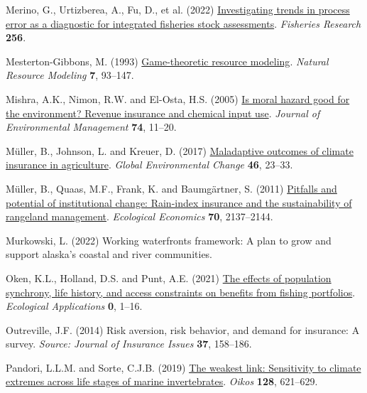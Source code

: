 \documentclass[
  letterpaper,
  DIV=11,
  numbers=noendperiod]{scrartcl}
\newlength{\cslhangindent}
\newlength{\cslentryspacingunit} %
\newenvironment{CSLReferences}[2] %
 {%
  \setlength{\parindent}{0pt}
  \ifodd #1
  \let\oldpar\par
  \def\par{\hangindent=\cslhangindent\oldpar}
  \fi
  \setlength{\parskip}{#2\cslentryspacingunit}
 }%
 {}
\theoremstyle{plain}
\theoremstyle{plain}
\theoremstyle{remark}
\begin{document}
\begin{CSLReferences}{1}{0}
\leavevmode{}%
Merino, G., Urtizberea, A., Fu, D., et al. (2022)
\href{https://doi.org/10.1016/j.fishres.2022.106478}{Investigating
trends in process error as a diagnostic for integrated fisheries stock
assessments}. \emph{Fisheries Research} \textbf{256}.

\leavevmode{}%
Mesterton-Gibbons, M. (1993)
\href{https://doi.org/10.1111/j.1939-7445.1993.tb00143.x}{Game-theoretic
resource modeling}. \emph{Natural Resource Modeling} \textbf{7},
93--147.

\leavevmode{}%
Mishra, A.K., Nimon, R.W. and El-Osta, H.S. (2005)
\href{https://doi.org/10.1016/j.jenvman.2004.08.003}{Is moral hazard
good for the environment? Revenue insurance and chemical input use}.
\emph{Journal of Environmental Management} \textbf{74}, 11--20.

\leavevmode{}%
Müller, B., Johnson, L. and Kreuer, D. (2017)
\href{https://doi.org/10.1016/j.gloenvcha.2017.06.010}{Maladaptive
outcomes of climate insurance in agriculture}. \emph{Global
Environmental Change} \textbf{46}, 23--33.

\leavevmode{}%
Müller, B., Quaas, M.F., Frank, K. and Baumgärtner, S. (2011)
\href{https://doi.org/10.1016/j.ecolecon.2011.06.011}{Pitfalls and
potential of institutional change: Rain-index insurance and the
sustainability of rangeland management}. \emph{Ecological Economics}
\textbf{70}, 2137--2144.

\leavevmode{}%
Murkowski, L. (2022) Working waterfronts framework: A plan to grow and
support alaska's coastal and river communities.

\leavevmode{}%
Oken, K.L., Holland, D.S. and Punt, A.E. (2021)
\href{https://doi.org/10.1002/eap.2307}{The effects of population
synchrony, life history, and access constraints on benefits from fishing
portfolios}. \emph{Ecological Applications} \textbf{0}, 1--16.

\leavevmode{}%
Outreville, J.F. (2014) Risk aversion, risk behavior, and demand for
insurance: A survey. \emph{Source: Journal of Insurance Issues}
\textbf{37}, 158--186.

\leavevmode{}%
Pandori, L.L.M. and Sorte, C.J.B. (2019)
\href{https://doi.org/10.1111/oik.05886}{The weakest link: Sensitivity
to climate extremes across life stages of marine invertebrates}.
\emph{Oikos} \textbf{128}, 621--629.


\end{CSLReferences}
\end{document}
